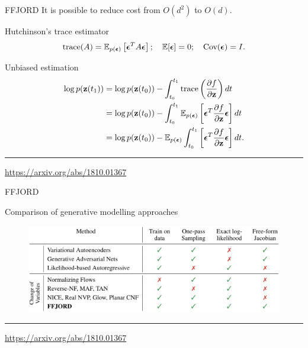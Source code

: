\begin{frame}{FFJORD}
	It is possible to reduce cost from $O(d^2)$ to $O(d)$.
	\begin{block}{Hutchinson's trace estimator}
	\[
	    \text{trace}(A) = \mathbb{E}_{p(\boldsymbol{\epsilon})} \left[ \boldsymbol{\epsilon}^T A \boldsymbol{\epsilon} \right]; \quad \mathbb{E} [\boldsymbol{\epsilon}] = 0; \quad \text{Cov} (\boldsymbol{\epsilon}) = I.
	\]
	\end{block}
	\begin{block}{Unbiased estimation}
		\vspace{-0.3cm}
	\begin{align*}
	    \log p(\mathbf{z}(t_1)) &= \log p(\mathbf{z}(t_0)) - \int_{t_0}^{t_1} \text{trace} \left( \frac{\partial f}{\partial \mathbf{z}} \right) dt \\
	    &= \log p(\mathbf{z}(t_0)) - \int_{t_0}^{t_1} \mathbb{E}_{p(\boldsymbol{\epsilon})} \left[ \boldsymbol{\epsilon}^T \frac{\partial f}{\partial \mathbf{z}} \boldsymbol{\epsilon} \right] dt \\
	    &= \log p(\mathbf{z}(t_0)) - \mathbb{E}_{p(\boldsymbol{\epsilon})} \int_{t_0}^{t_1} \left[ \boldsymbol{\epsilon}^T \frac{\partial f}{\partial \mathbf{z}} \boldsymbol{\epsilon} \right] dt.
	\end{align*}
	\end{block}
	\vspace{0.3cm}

	\vfill
	\hrule\medskip
	{\scriptsize \href{https://arxiv.org/abs/1810.01367}{https://arxiv.org/abs/1810.01367}} 
\end{frame}
\begin{frame}{FFJORD}
	\begin{block}{Comparison of generative modelling approaches}
		\begin{figure}
		    \centering
		    \includegraphics[width=\linewidth]{figs/flow_comparison.png}
		\end{figure}
	\end{block}
	\vspace{1cm}
	
	\hrule\medskip
	{\scriptsize \href{https://arxiv.org/abs/1810.01367}{https://arxiv.org/abs/1810.01367}} 
\end{frame}
